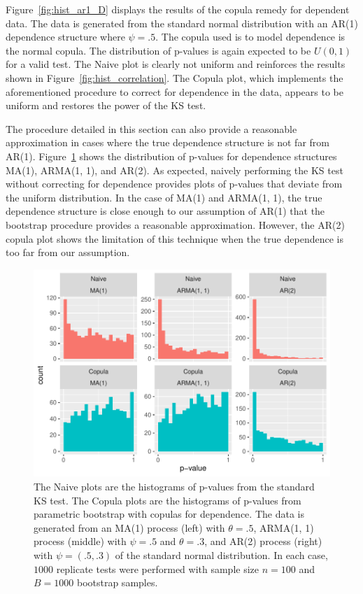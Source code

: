 \documentclass[12pt, letterpaper, titlepage]{article}
\begin{document}
Figure~\ref{fig:hist_ar1_D} displays the results of the copula remedy for 
dependent data. The data is generated from the standard normal distribution with
an AR(1) dependence structure where $\psi = .5$. The copula used is to model 
dependence is the normal copula. The distribution of p-values is again expected
to be $U(0, 1)$ for a valid test. The Naive plot is clearly not uniform and 
reinforces the results shown in Figure~\ref{fig:hist_correlation}. The Copula 
plot, which implements the aforementioned procedure to correct for dependence
in the data, appears to be uniform and restores the power of the KS test.

The procedure detailed in this section can also provide a reasonable 
approximation in cases where the true dependence structure is not far from 
AR(1). Figure~\ref{fig:hist_ma1_arma_ar2_D} shows the distribution of p-values 
for dependence structures MA(1), ARMA(1, 1), and AR(2). As expected, 
naively performing the KS test without correcting for dependence provides plots 
of p-values that deviate from the uniform distribution. In the case of MA(1) 
and ARMA(1, 1), the true dependence structure is close enough to our 
assumption of AR(1) that the bootstrap procedure provides a reasonable 
approximation. However, the AR(2) copula plot shows the limitation of this 
technique when the true dependence is too far from our assumption.

\begin{figure}[tbp]
  \centering
  \includegraphics{hist_ma1_arma_ar2_D}
  \caption{The Naive plots are the histograms of p-values from the standard KS 
  test. The Copula plots are the histograms of p-values from parametric 
  bootstrap with copulas for dependence. The data is generated from an MA(1) 
  process (left) with $\theta = .5$, ARMA(1, 1) process (middle) with $\psi = 
  .5$ and $\theta = .3$, and AR(2) process (right) with $\psi = (.5, .3)$ of the 
  standard normal distribution. In each case, $1000$ replicate tests were 
  performed with sample size $n = 100$ and $B = 1000$ bootstrap samples.}
  \label{fig:hist_ma1_arma_ar2_D}
\end{figure}
\end{document}

